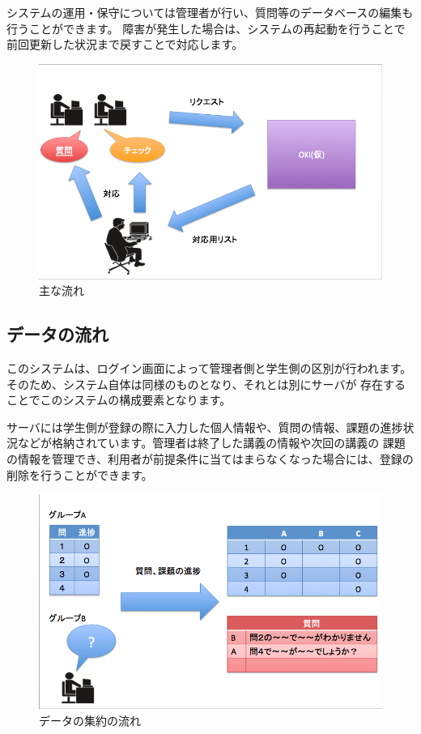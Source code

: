 \documentclass[a4j,titlepage]{ujarticle}
\begin{document}
システムの運用・保守については管理者が行い、質問等のデータベースの編集も行うことができます。
障害が発生した場合は、システムの再起動を行うことで前回更新した状況まで戻すことで対応します。 %
\begin{figure}[h]

\centering
   \includegraphics[width=13cm]{hito.png}
  \caption{主な流れ}
\end{figure}


\subsection{データの流れ}
このシステムは、ログイン画面によって管理者側と学生側の区別が行われます。そのため、システム自体は同様のものとなり、それとは別にサーバが %
存在することでこのシステムの構成要素となります。

サーバには学生側が登録の際に入力した個人情報や、質問の情報、課題の進捗状況などが格納されています。管理者は終了した講義の情報や次回の講義の
課題の情報を管理でき、利用者が前提条件に当てはまらなくなった場合には、登録の削除を行うことができます。
\begin{figure}[h]

\centering
   \includegraphics[width=13cm]{ui.png}
  \caption{データの集約の流れ}
\end{figure}
\end{document}
